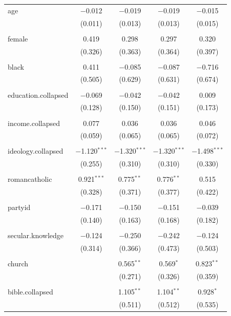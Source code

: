\documentclass[12pt,letterpaper]{article}
\begin{document}
\begin{description}
\begin{table}[H]
\begin{tabular}{@{\extracolsep{5pt}}lcccc}
		age & $-$0.012 & $-$0.019 & $-$0.019 & $-$0.015 \\ 
		& (0.011) & (0.013) & (0.013) & (0.015) \\ 
		& & & & \\ 
		female & 0.419 & 0.298 & 0.297 & 0.320 \\ 
		& (0.326) & (0.363) & (0.364) & (0.397) \\ 
		& & & & \\ 
		black & 0.411 & $-$0.085 & $-$0.087 & $-$0.716 \\ 
		& (0.505) & (0.629) & (0.631) & (0.674) \\ 
		& & & & \\ 
		education.collapsed & $-$0.069 & $-$0.042 & $-$0.042 & 0.009 \\ 
		& (0.128) & (0.150) & (0.151) & (0.173) \\ 
		& & & & \\ 
		income.collapsed & 0.077 & 0.036 & 0.036 & 0.046 \\ 
		& (0.059) & (0.065) & (0.065) & (0.072) \\ 
		& & & & \\ 
		ideology.collapsed & $-$1.120$^{***}$ & $-$1.320$^{***}$ & $-$1.320$^{***}$ & $-$1.498$^{***}$ \\ 
		& (0.255) & (0.310) & (0.310) & (0.330) \\ 
		& & & & \\ 
		romancatholic & 0.921$^{***}$ & 0.775$^{**}$ & 0.776$^{**}$ & 0.515 \\ 
		& (0.328) & (0.371) & (0.377) & (0.422) \\ 
		& & & & \\ 
		partyid & $-$0.171 & $-$0.150 & $-$0.151 & $-$0.039 \\ 
		& (0.140) & (0.163) & (0.168) & (0.182) \\ 
		& & & & \\ 
		secular.knowledge & $-$0.124 & $-$0.250 & $-$0.242 & $-$0.124 \\ 
		& (0.314) & (0.366) & (0.473) & (0.503) \\ 
		& & & & \\ 
		church &  & 0.565$^{**}$ & 0.569$^{*}$ & 0.823$^{**}$ \\ 
		&  & (0.271) & (0.326) & (0.359) \\ 
		& & & & \\ 
		bible.collapsed &  & 1.105$^{**}$ & 1.104$^{**}$ & 0.928$^{*}$ \\ 
		&  & (0.511) & (0.512) & (0.535) \\ 

\end{tabular}
\end{table}
\end{description}
\end{document}

